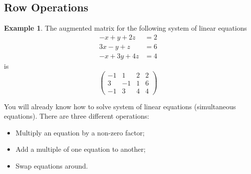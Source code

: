 \documentclass{report}
\theoremstyle{remark}
\theoremstyle{definition}
\theoremstyle{definition}
\newtheorem{example}[theorem]{Example}
\theoremstyle{theorem}
\begin{document}
\subsection{Row Operations}
\begin{example}
The augmented matrix for the following system of linear equations
\[ \begin{split}
-x+y+2z&=2\\
3x-y+z&=6\\
-x+3y+4z&=4
\end{split} \]
is
\[ \left(
\begin{array}{rrr|r}
-1&1&2&2\\
3&-1&1&6\\
-1&3&4&4
\end{array} \right) \]
\end{example}
You will already know how to solve system of linear equations (simultaneous equations). There are three different operations:
\begin{itemize}
\item Multiply an equation by a non-zero factor;
\item Add a multiple of one equation to another;
\item Swap equations around.
\end{itemize}
\end{document}
